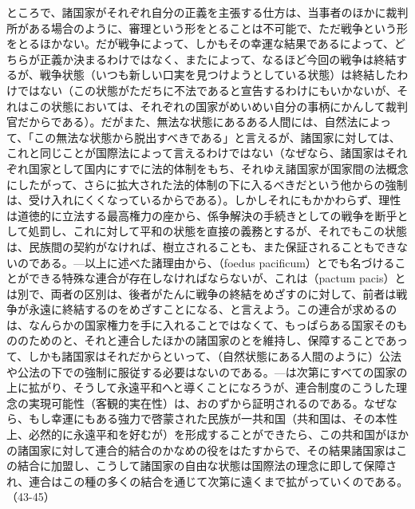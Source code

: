 ところで、諸国家がそれぞれ自分の正義を主張する仕方は、当事者のほかに裁判所がある場合のように、審理という形をとることは不可能で、ただ戦争という形をとるほかない。だが戦争によって、しかもその幸運な結果であるによって、どちらが正義か決まるわけではなく、またによって、なるほど今回の戦争は終結するが、戦争状態（いつも新しい口実を見つけようとしている状態）は終結したわけではない（この状態がただちに不法であると宣告するわけにもいかないが、それはこの状態においては、それぞれの国家がめいめい自分の事柄にかんして裁判官だからである）。だがまた、無法な状態にあるある人間には、自然法によって、「この無法な状態から脱出すべきである」と言えるが、諸国家に対しては、これと同じことが国際法によって言えるわけではない（なぜなら、諸国家はそれぞれ国家として国内にすでに法的体制をもち、それゆえ諸国家が国家間の法概念にしたがって、さらに拡大された法的体制の下に入るべきだという他からの強制は、受け入れにくくなっているからである）。しかしそれにもかかわらず、理性は道徳的に立法する最高権力の座から、係争解決の手続きとしての戦争を断乎として処罰し、これに対して平和の状態を直接の義務とするが、それでもこの状態は、民族間の契約がなければ、樹立されることも、また保証されることもできないのである。{\——}以上に述べた諸理由から、（foedus pacificum）とでも名づけることができる特殊な連合が存在しなければならないが、これは（pactum pacis）とは別で、両者の区別は、後者がたんに戦争の終結をめざすのに対して、前者は戦争が永遠に終結するのをめざすことになる、と言えよう。この連合が求めるのは、なんらかの国家権力を手に入れることではなくて、もっぱらある国家そのもののためのと、それと連合したほかの諸国家のとを維持し、保障することであって、しかも諸国家はそれだからといって、（自然状態にある人間のように）公法や公法の下での強制に服従する必要はないのである。{\——}は次第にすべての国家の上に拡がり、そうして永遠平和へと導くことになろうが、連合制度のこうした理念の実現可能性（客観的実在性）は、おのずから証明されるのである。なぜなら、もし幸運にもある強力で啓蒙された民族が一共和国（共和国は、その本性上、必然的に永遠平和を好むが）を形成することができたら、この共和国がほかの諸国家に対して連合的結合のかなめの役をはたすからで、その結果諸国家はこの結合に加盟し、こうして諸国家の自由な状態は国際法の理念に即して保障され、連合はこの種の多くの結合を通じて次第に遠くまで拡がっていくのである。（43-45）

\subsection{}



